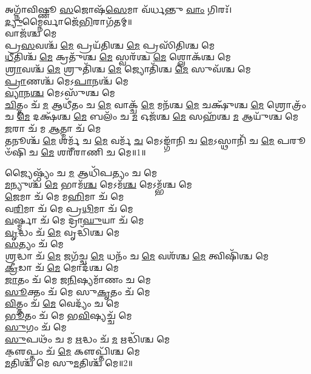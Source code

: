 

𑌅𑌗𑍍𑌨𑌾᳴𑌵𑌿𑌷𑍍𑌣𑍂 \ul{𑌸}\-𑌜𑍋𑌷᳴\-\ul{𑌸𑍇}\-𑌮𑌾 𑌵᳴𑌰𑍍𑌧𑌨𑍍𑌤𑍁 \ul{𑌵𑌾𑌂} 𑌗𑌿𑌰𑌃᳴।\\
\-\ul{𑌦𑍍𑌯𑍁}\-𑌮𑍍𑌨𑍈𑌰𑍍𑌵𑌾𑌜𑍇᳴\-\ul{𑌭𑌿}\-𑌰𑌾\-𑌗᳴𑌤𑌮𑍍॥\\ 
𑌵𑌾𑌜᳴𑌶𑍍𑌚 𑌮𑍇\\
𑌪𑍍𑌰\-\ul{𑌸}\-𑌵𑌶𑍍𑌚᳴ \ul{𑌮𑍇} 𑌪𑍍𑌰𑌯᳴𑌤𑌿𑌶𑍍𑌚 \ul{𑌮𑍇} 𑌪𑍍𑌰𑌸𑌿᳴𑌤𑌿𑌶𑍍𑌚 𑌮𑍇\\
\-\ul{𑌧𑍀}\-𑌤𑌿𑌶𑍍𑌚᳴ \ul{𑌮𑍇} 𑌕𑍍𑌰𑌤𑍁᳴𑌶𑍍𑌚 \ul{𑌮𑍇} 𑌸𑍍𑌵𑌰᳴𑌶𑍍𑌚 \ul{𑌮𑍇} 𑌶𑍍𑌲𑍋𑌕᳴𑌶𑍍𑌚 𑌮𑍇\\
\-\ul{𑌶𑍍𑌰𑌾}\-𑌵𑌶𑍍𑌚᳴ \ul{𑌮𑍇} 𑌶𑍍𑌰𑍁𑌤𑌿᳴𑌶𑍍𑌚 \ul{𑌮𑍇} 𑌜𑍍𑌯𑍋𑌤𑌿᳴𑌶𑍍𑌚 \ul{𑌮𑍇} 𑌸𑍁𑌵᳴𑌶𑍍𑌚 𑌮𑍇\\
\-\ul{𑌪𑍍𑌰𑌾}\-𑌣𑌶𑍍𑌚᳴ 𑌮𑍇𑌽\-\ul{𑌪𑌾}\-𑌨𑌶𑍍𑌚᳴ 𑌮𑍇\\
\-\ul{𑌵𑍍𑌯𑌾}\-𑌨\-\ul{𑌶𑍍𑌚} 𑌮𑍇𑌽𑌸𑍁᳴𑌶𑍍𑌚 𑌮𑍇\\
\-\ul{𑌚𑌿}\-𑌤𑍍𑌤𑌂 𑌚᳴ \ul{𑌮} 𑌆𑌧𑍀᳴𑌤𑌂 𑌚 \ul{𑌮𑍇} 𑌵𑌾𑌕𑍍𑌚᳴ \ul{𑌮𑍇} 𑌮𑌨᳴𑌶𑍍𑌚 \ul{𑌮𑍇} 𑌚𑌕𑍍𑌷𑍁᳴𑌶𑍍𑌚 \ul{𑌮𑍇} 𑌶𑍍𑌰𑍋𑌤𑍍𑌰𑌂᳴ 𑌚 \ul{𑌮𑍇} 𑌦𑌕𑍍𑌷᳴𑌶𑍍𑌚 \ul{𑌮𑍇} 𑌬𑌲𑌂᳴ 𑌚 \ul{𑌮} 𑌓𑌜᳴𑌶𑍍𑌚 \ul{𑌮𑍇} 𑌸𑌹᳴𑌶𑍍𑌚 \ul{𑌮} 𑌆𑌯𑍁᳴𑌶𑍍𑌚 𑌮𑍇\\
\-\ul{𑌜}\-𑌰𑌾 𑌚᳴ 𑌮 \ul{𑌆}\-𑌤𑍍𑌮𑌾 𑌚᳴ 𑌮𑍇\\
\-\ul{𑌤}\-𑌨𑍂𑌶𑍍𑌚᳴ \ul{𑌮𑍇} 𑌶𑌰𑍍𑌮᳴ 𑌚 \ul{𑌮𑍇} 𑌵𑌰𑍍𑌮᳴ \ul{𑌚} 𑌮𑍇𑌽𑌙𑍍𑌗𑌾᳴𑌨𑌿 𑌚 \ul{𑌮𑍇}\-𑌽𑌸𑍍𑌥𑌾𑌨𑌿᳴ 𑌚 \ul{𑌮𑍇} 𑌪𑌰𑍂𑍞᳴𑌷𑌿 𑌚 \ul{𑌮𑍇} 𑌶𑌰𑍀᳴𑌰𑌾𑌣𑌿 𑌚 𑌮𑍇॥1॥ 

𑌜𑍍𑌯𑍈𑌷𑍍𑌠𑍍𑌯𑌂᳴ 𑌚 \ul{𑌮} 𑌆𑌧𑌿᳴𑌪𑌤𑍍𑌯𑌂 𑌚 𑌮𑍇\\
\-\ul{𑌮}\-𑌨𑍍𑌯𑍁𑌶𑍍𑌚᳴ \ul{𑌮𑍇} 𑌭𑌾𑌮᳴\-\ul{𑌶𑍍𑌚} 𑌮𑍇𑌽𑌮᳴\-\ul{𑌶𑍍𑌚} 𑌮𑍇𑌽𑌮𑍍𑌭᳴𑌶𑍍𑌚 𑌮𑍇\\
\-\ul{𑌜𑍇}\-𑌮𑌾 𑌚᳴ 𑌮𑍇 𑌮\-\ul{𑌹𑌿}\-𑌮𑌾 𑌚᳴ 𑌮𑍇\\
𑌵\-\ul{𑌰𑌿}\-𑌮𑌾 𑌚᳴ 𑌮𑍇 𑌪𑍍𑌰\-\ul{𑌥𑌿}\-𑌮𑌾 𑌚᳴ 𑌮𑍇\\
\-\ul{𑌵}\-𑌰𑍍𑌷𑍍𑌮𑌾 𑌚᳴ 𑌮𑍇 𑌦𑍍𑌰𑌾\-\ul{𑌘𑍁}\-𑌯𑌾 𑌚᳴ 𑌮𑍇\\
\-\ul{𑌵𑍃}\-𑌦𑍍𑌧𑌂 𑌚᳴ \ul{𑌮𑍇} 𑌵𑍃𑌦𑍍𑌧𑌿᳴𑌶𑍍𑌚 𑌮𑍇\\
\-\ul{𑌸}\-𑌤𑍍𑌯𑌂 𑌚᳴ 𑌮𑍇\\
\-\ul{𑌶𑍍𑌰}\-𑌦𑍍𑌧𑌾 𑌚᳴ \ul{𑌮𑍇} 𑌜𑌗᳴𑌚𑍍𑌚 \ul{𑌮𑍇} 𑌧𑌨𑌂᳴ 𑌚 \ul{𑌮𑍇} 𑌵𑌶᳴𑌶𑍍𑌚 \ul{𑌮𑍇} 𑌤𑍍𑌵𑌿𑌷𑌿᳴𑌶𑍍𑌚 𑌮𑍇\\
\-\ul{𑌕𑍍𑌰𑍀}\-𑌡𑌾 𑌚᳴ \ul{𑌮𑍇} 𑌮𑍋𑌦᳴𑌶𑍍𑌚 𑌮𑍇\\
\-\ul{𑌜𑌾}\-𑌤𑌂 𑌚᳴ 𑌮𑍇 𑌜\-\ul{𑌨𑌿}\-𑌷𑍍𑌯𑌮𑌾᳴𑌣𑌂 𑌚 𑌮𑍇\\
\-\ul{𑌸𑍂}\-𑌕𑍍𑌤𑌂 𑌚᳴ 𑌮𑍇 𑌸𑍁\-\ul{𑌕𑍃}\-𑌤𑌂 𑌚᳴ 𑌮𑍇\\
\-\ul{𑌵𑌿}\-𑌤𑍍𑌤𑌂 𑌚᳴ \ul{𑌮𑍇} 𑌵𑍇𑌦𑍍𑌯𑌂᳴ 𑌚 𑌮𑍇\\
\-\ul{𑌭𑍂}\-𑌤𑌂 𑌚᳴ 𑌮𑍇 𑌭\-\ul{𑌵𑌿}\-𑌷𑍍𑌯𑌚𑍍𑌚᳴ 𑌮𑍇\\
\-\ul{𑌸𑍁}\-𑌗𑌂 𑌚᳴ 𑌮𑍇\\
\-\ul{𑌸𑍁}\-𑌪𑌥𑌂᳴ 𑌚 𑌮 \ul{𑌋}\-𑌦𑍍𑌧𑌂 𑌚᳴ \ul{𑌮} 𑌋𑌦𑍍𑌧𑌿᳴𑌶𑍍𑌚 𑌮𑍇\\
𑌕𑍢॒𑌪𑍍𑌤𑌂 𑌚᳴ \ul{𑌮𑍇} 𑌕𑍢𑌪𑍍𑌤𑌿᳴𑌶𑍍𑌚 𑌮𑍇\\
\-\ul{𑌮}\-𑌤𑌿𑌶𑍍𑌚᳴ 𑌮𑍇 𑌸𑍁\-\ul{𑌮}\-𑌤𑌿𑌶𑍍𑌚᳴ 𑌮𑍇॥2॥ 

